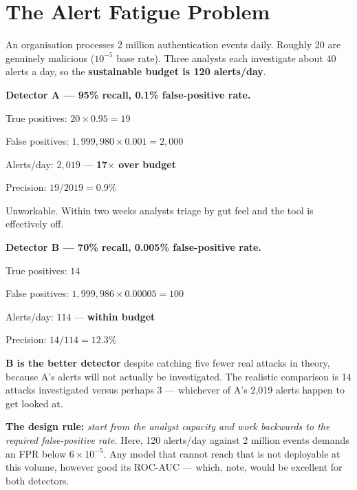 \section{The Alert Fatigue Problem}

\begin{worked}
An organisation processes 2 million authentication events daily. Roughly 20 are
genuinely malicious ($10^{-5}$ base rate). Three analysts each investigate about
40 alerts a day, so the \textbf{sustainable budget is 120 alerts/day}.

\smallskip
\textbf{Detector A --- 95\% recall, 0.1\% false-positive rate.}
\begin{tight}
  \item True positives: $20 \times 0.95 = 19$
  \item False positives: $1{,}999{,}980 \times 0.001 = 2{,}000$
  \item Alerts/day: $2{,}019$ --- \textbf{17$\times$ over budget}
  \item Precision: $19/2019 = 0.9\%$
\end{tight}
Unworkable. Within two weeks analysts triage by gut feel and the tool is
effectively off.

\smallskip
\textbf{Detector B --- 70\% recall, 0.005\% false-positive rate.}
\begin{tight}
  \item True positives: $14$
  \item False positives: $1{,}999{,}986 \times 0.00005 = 100$
  \item Alerts/day: $114$ --- \textbf{within budget}
  \item Precision: $14/114 = 12.3\%$
\end{tight}

\smallskip
\textbf{B is the better detector} despite catching five fewer real attacks in
theory, because A's alerts will not actually be investigated. The realistic
comparison is 14 attacks investigated versus perhaps 3 --- whichever of A's 2{,}019
alerts happen to get looked at.

\smallskip
\textbf{The design rule:} \emph{start from the analyst capacity and work backwards
to the required false-positive rate.} Here, 120 alerts/day against 2 million events
demands an FPR below $6\times10^{-5}$. Any model that cannot reach that is not
deployable at this volume, however good its ROC-AUC --- which, note, would be
excellent for both detectors.
\end{worked}

